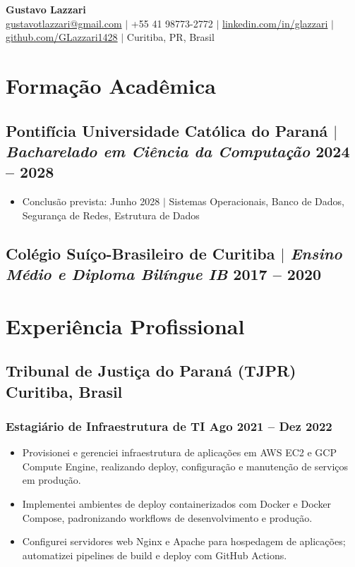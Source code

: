 \documentclass[10pt]{article}
\begin{document}
\begin{center}
	{\LARGE\bfseries Gustavo Lazzari} \\
	\vspace{2pt}
	\href{mailto:gustavotlazzari@gmail.com}{gustavotlazzari@gmail.com} $|$
	+55 41 98773-2772 $|$
	\href{https://www.linkedin.com/in/glazzari}{linkedin.com/in/glazzari} $|$
	\href{https://github.com/GLazzari1428}{github.com/GLazzari1428} $|$
	Curitiba, PR, Brasil
\end{center}

\section{Forma\c{c}\~{a}o Acad\^{e}mica}
\subsection{Pontif\'{i}cia Universidade Cat\'{o}lica do Paran\'{a} $|$ {\normalfont\itshape Bacharelado em Ci\^{e}ncia da Computa\c{c}\~{a}o} \hfill 2024 -- 2028}
\begin{itemize}
	\item Conclus\~{a}o prevista: Junho 2028 $|$ Sistemas Operacionais, Banco de Dados, Seguran\c{c}a de Redes, Estrutura de Dados
\end{itemize}
\subsection{Col\'{e}gio Su\'{i}\c{c}o-Brasileiro de Curitiba $|$ {\normalfont\itshape Ensino M\'{e}dio e Diploma Bil\'{i}ngue IB} \hfill 2017 -- 2020}

\section{Experi\^{e}ncia Profissional}
\subsection{Tribunal de Justi\c{c}a do Paran\'{a} (TJPR) \hfill Curitiba, Brasil}
\subsubsection{Estagi\'{a}rio de Infraestrutura de TI \hfill Ago 2021 -- Dez 2022}
\begin{itemize}
	\item Provisionei e gerenciei infraestrutura de aplica\c{c}\~{o}es em AWS EC2 e GCP Compute Engine, realizando deploy, configura\c{c}\~{a}o e manuten\c{c}\~{a}o de servi\c{c}os em produ\c{c}\~{a}o.
	\item Implementei ambientes de deploy containerizados com Docker e Docker Compose, padronizando workflows de desenvolvimento e produ\c{c}\~{a}o.
	\item Configurei servidores web Nginx e Apache para hospedagem de aplica\c{c}\~{o}es; automatizei pipelines de build e deploy com GitHub Actions.
\end{itemize}
\end{document}
